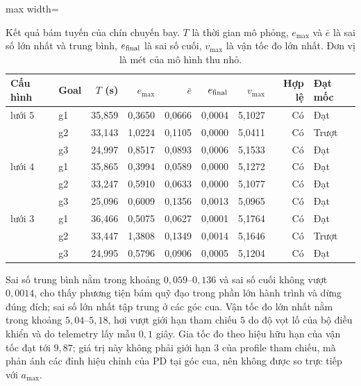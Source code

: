 \begin{table}[!t]
  \caption{Kết quả bám tuyến của chín chuyến bay. $T$ là thời gian mô phỏng,
    $e_{\max}$ và $\bar e$ là sai số lớn nhất và trung bình, $e_{\rm final}$ là
    sai số cuối, $v_{\max}$ là vận tốc đo lớn nhất. Đơn vị là mét của mô hình thu
    nhỏ.}
  \label{tab:tracking}
  {\fontsize{7}{8.6}\selectfont
  \begin{adjustbox}{max width=\textwidth}
  \begin{tabular}{@{}llrrrrrrl@{}}
    \toprule
    Cấu hình & Goal & $T$ (s) & $e_{\max}$ & $\bar e$ & $e_{\rm final}$
      & $v_{\max}$ & Hợp lệ & Đạt mốc \\
    \midrule
    lưới $5$ & g1 & 35,859 & 0,3650 & 0,0666 & 0,0004 & 5,1027 & Có & Đạt \\
             & g2 & 33,143 & 1,0224 & 0,1105 & 0,0000 & 5,0411 & Có & Trượt \\
             & g3 & 24,997 & 0,8517 & 0,0893 & 0,0006 & 5,1533 & Có & Đạt \\
    \midrule
    lưới $4$ & g1 & 35,865 & 0,3994 & 0,0589 & 0,0000 & 5,1272 & Có & Đạt \\
             & g2 & 33,247 & 0,5910 & 0,0633 & 0,0000 & 5,1077 & Có & Đạt \\
             & g3 & 25,096 & 0,6009 & 0,1356 & 0,0013 & 5,0965 & Có & Đạt \\
    \midrule
    lưới $3$ & g1 & 36,466 & 0,5075 & 0,0627 & 0,0001 & 5,1764 & Có & Đạt \\
             & g2 & 33,447 & 1,3808 & 0,1349 & 0,0014 & 5,1646 & Có & Trượt \\
             & g3 & 24,995 & 0,5796 & 0,0906 & 0,0005 & 5,1204 & Có & Đạt \\
    \bottomrule
  \end{tabular}
  \end{adjustbox}}
\end{table}

Sai số trung bình nằm trong khoảng $0{,}059$--$0{,}136$ và sai số cuối không vượt
$0{,}0014$, cho thấy phương tiện bám quỹ đạo trong phần lớn hành trình và dừng
đúng đích; sai số lớn nhất tập trung ở các góc cua. Vận tốc đo lớn nhất nằm trong
khoảng $5{,}04$--$5{,}18$, hơi vượt giới hạn tham chiếu $5$ do độ vọt lố của bộ
điều khiển và do telemetry lấy mẫu $0{,}1$ giây. Gia tốc đo theo hiệu hữu hạn của
vận tốc đạt tới $9{,}87$; giá trị này không phải giới hạn $3$ của profile tham
chiếu, mà phản ánh các đỉnh hiệu chỉnh của PD tại góc cua, nên không được so trực
tiếp với $a_{\max}$.


